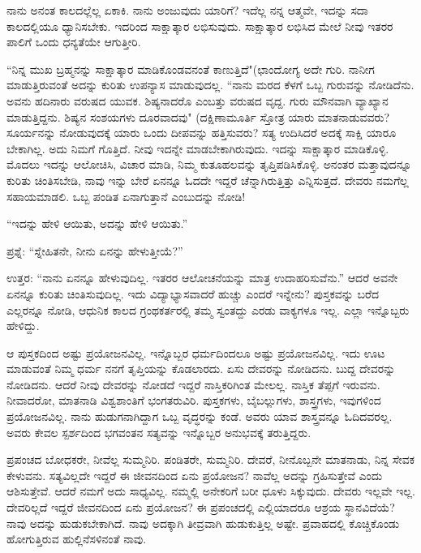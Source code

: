 ನಾನು ಅನಂತ ಕಾಲದಲ್ಲೆಲ್ಲ ಏಕಾಕಿ. ನಾನು ಅಂಜುವುದು ಯಾರಿಗೆ? ಇದೆಲ್ಲ ನನ್ನ ಆತ್ಮವೇ, ಇದನ್ನು ಸದಾ ಕಾಲದಲ್ಲಿಯೂ ಧ್ಯಾನಿಸಬೇಕು. ಇದರಿಂದ ಸಾಕ್ಷಾತ್ಕಾರ ಲಭಿಸುವುದು. ಸಾಕ್ಷಾತ್ಕಾರ ಲಭಿಸಿದ ಮೇಲೆ ನೀವು ಇತರರ ಪಾಲಿಗೆ ಒಂದು ಧನ್ಯತೆಯೇ ಆಗುತ್ತೀರಿ.

“ನಿನ್ನ ಮುಖ ಬ್ರಹ್ಮನನ್ನು ಸಾಕ್ಷಾತ್ಕಾರ ಮಾಡಿಕೊಂಡವನಂತೆ ಕಾಣುತ್ತಿದೆ"\break (ಛಾಂದೋಗ್ಯ  ಅದೇ ಗುರಿ. ನಾನೀಗ ಮಾಡುತ್ತಿರುವಂತೆ ಅದನ್ನು ಕುರಿತು ಉಪನ್ಯಾಸ ಮಾಡುವುದಲ್ಲ. “ನಾನು ಮರದ ಕೆಳಗೆ ಒಬ್ಬ ಗುರುವನ್ನು ನೋಡಿದೆನು. ಅವನು ಹದಿನಾರು ವರುಷದ ಯುವಕ. ಶಿಷ್ಯನಾದರೊ ಎಂಬತ್ತು ವರುಷದ ವೃದ್ದ. ಗುರು ಮೌನವಾಗಿ ವ್ಯಾಖ್ಯಾನ ಮಾಡುತ್ತಿದ್ದನು. ಶಿಷ್ಯನ ಸಂಶಯಗಳು ದೂರವಾದವು" (ದಕ್ಷಿಣಾಮೂರ್ತಿ ಸ್ತೋತ್ರ  ಯಾರು ಮಾತನಾಡುವವರು? ಸೂರ್ಯನನ್ನು ನೋಡುವುದಕ್ಕೆ ಯಾರು ಒಂದು ದೀಪವನ್ನು ಹತ್ತಿಸುವರು? ಸತ್ಯ ಉದಿಸಿದರೆ ಅದಕ್ಕೆ ಸಾಕ್ಷಿ ಯಾರೂ ಬೇಕಾಗಿಲ್ಲ. ಅದು ನಿಮಗೆ ಗೊತ್ತಿದೆ. ನೀವು ಇದನ್ನೇ ಮಾಡಬೇಕಾಗಿರುವುದು. ಇದನ್ನು ಸಾಕ್ಷಾತ್ಕಾರ ಮಾಡಿಕೊಳ್ಳಿ. ಮೊದಲು ಇದನ್ನು ಆಲೋಚಿಸಿ, ವಿಚಾರ ಮಾಡಿ, ನಿಮ್ಮ ಕುತೂಹಲವನ್ನು ತೃಪ್ತಿಪಡಿಸಿಕೊಳ್ಳಿ. ಅನಂತರ ಮತ್ತಾವುದನ್ನೂ ಕುರಿತು ಚಿಂತಿಸಬೇಡಿ, ನಾವು ಇನ್ನು ಬೇರೆ ಏನನ್ನೂ ಓದದೇ ಇದ್ದರೆ ಚೆನ್ನಾಗಿರುತ್ತಿತ್ತು ಎನ್ನಿಸುತ್ತದೆ. ದೇವರು ನಮಗೆಲ್ಲ ಸಹಾಯಮಾಡಲಿ. ಒಬ್ಬ ಪಂಡಿತ ಏನಾಗುತ್ತಾನೆ ಎಂಬುದನ್ನು ನೋಡಿ!

“ಇದನ್ನು ಹೇಳಿ ಆಯಿತು, ಅದನ್ನು ಹೇಳಿ ಆಯಿತು.”

ಪ್ರಶ್ನೆ: “ಸ್ನೇಹಿತನೇ, ನೀನು ಏನನ್ನು ಹೇಳುತ್ತೀಯೆ?”

ಉತ್ತರ: “ನಾನು ಏನನ್ನೂ ಹೇಳುವುದಿಲ್ಲ. ಇತರರ ಆಲೋಚನೆಯನ್ನು ಮಾತ್ರ ಉದಾಹರಿಸುವೆನು.” ಆದರೆ ಅವನೇ ಏನನ್ನೂ ಕುರಿತು ಚಿಂತಿಸುವುದಿಲ್ಲ. ಇದು ವಿದ್ಯಾಭ್ಯಾಸವಾದರೆ ಹುಚ್ಚು ಎಂದರೆ ಇನ್ನೇನು? ಪುಸ್ತಕವನ್ನು ಬರೆದ ಎಲ್ಲರನ್ನೂ ನೋಡಿ, ಆಧುನಿಕ ಕಾಲದ ಗ್ರಂಥಕರ್ತರಲ್ಲಿ ತಮ್ಮ ಸ್ವಂತದ್ದು ಎರಡು ವಾಕ್ಯಗಳೂ ಇಲ್ಲ. ಎಲ್ಲಾ ಇನ್ನೊಬ್ಬರು ಹೇಳಿದ್ದು.

ಆ ಪುಸ್ತಕದಿಂದ ಅಷ್ಟು ಪ್ರಯೋಜನವಿಲ್ಲ. ಇನ್ನೊಬ್ಬರ ಧರ್ಮದಿಂದಲೂ ಅಷ್ಟು ಪ್ರಯೋಜನವಿಲ್ಲ. ಇದು ಊಟ ಮಾಡುವಂತೆ ನಿಮ್ಮ ಧರ್ಮ ನನಗೆ ತೃಪ್ತಿಯನ್ನು ಕೊಡಲಾರದು. ಏಸು ದೇವರನ್ನು ನೋಡಿದನು. ಬುದ್ದ ದೇವರನ್ನು ನೋಡಿದನು. ಆದರೆ ನೀವು ದೇವರನ್ನು ನೋಡದೆ ಇದ್ದರೆ ನಾಸ್ತಿಕರಿಗಿಂತ ಮೇಲಲ್ಲ. ನಾಸ್ತಿಕ ತೆಪ್ಪಗೆ ಇರುವನು. ನೀವಾದರೋ, ಮಾತನಾಡಿ ವಿಶ್ವಶಾಂತಿಗೆ ಭಂಗತರುವಿರಿ. ಪುಸ್ತಕಗಳು, ಬೈಬಲ್ಲುಗಳು, ಶಾಸ್ತ್ರಗಳು, ಇವುಗಳಿಂದ ಪ್ರಯೋಜನವಿಲ್ಲ. ನಾನು ಹುಡುಗನಾಗಿದ್ದಾಗ ಒಬ್ಬ ವೃದ್ಧರನ್ನು ಕಂಡೆ. ಅವರು ಯಾವ ಶಾಸ್ತ್ರವನ್ನೂ ಓದಿದವರಲ್ಲ. ಅವರು ಕೇವಲ ಸ್ಪರ್ಶದಿಂದ ಭಗವಂತನ ಸತ್ಯವನ್ನು ಇನ್ನೊಬ್ಬರ ಅನುಭವಕ್ಕೆ ತರುತ್ತಿದ್ದರು.

\newpage

ಪ್ರಪಂಚದ ಬೋಧಕರೇ, ನೀವೆಲ್ಲ ಸುಮ್ಮನಿರಿ. ಪಂಡಿತರೇ, ಸುಮ್ಮನಿರಿ. ದೇವರೆ, ನೀನೊಬ್ಬನೇ ಮಾತನಾಡು, ನಿನ್ನ ಸೇವಕ ಕೇಳುವನು. ಸತ್ಯವಿಲ್ಲದೇ ಇದ್ದರೆ ಈ ಜೀವನದಿಂದ ಏನು ಪ್ರಯೋಜನ? ನಾವೆಲ್ಲ ಅದನ್ನು ಗ್ರಹಿಸುತ್ತೇವೆ ಎಂದು ಆಶಿಸುತ್ತೇವೆ. ಆದರೆ ನಮಗೆ ಅದು ಸಾಧ್ಯವಿಲ್ಲ. ನಮ್ಮಲ್ಲಿ ಅನೇಕರಿಗೆ ಬರೀ ಧೂಳು ಸಿಕ್ಕುವುದು. ದೇವರು ಇಲ್ಲವೇ ಇಲ್ಲ. ದೇವರಿಲ್ಲದೆ ಇದ್ದರೆ ಜೀವನದಿಂದ ಏನು ಪ್ರಯೋಜನ? ಈ ಪ್ರಪಂಚದಲ್ಲಿ ಎಲ್ಲಿಯಾದರೂ ಆಶ್ರಯ ಸ್ಥಾನವಿದೆಯೆ? ನಾವು ಅದನ್ನು ಹುಡುಕಬೇಕಾಗಿದೆ. ನಾವು ಅದಕ್ಕಾಗಿ ತೀವ್ರವಾಗಿ ಹುಡುಕುತ್ತಿಲ್ಲ ಅಷ್ಟೇ. ಪ್ರವಾಹದಲ್ಲಿ ಕೊಚ್ಚಿಕೊಂಡು ಹೋಗುತ್ತಿರುವ ಹುಲ್ಲಿನೆಸಳಿನಂತೆ ನಾವು.

